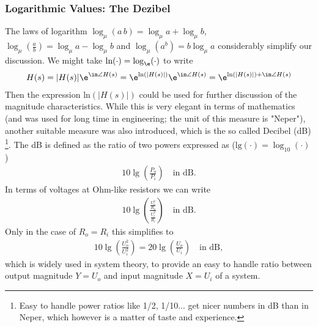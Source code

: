\subsubsection{Logarithmic Values: The Dezibel}
The laws of logarithm $\log_\mu (a \, b) = \log_\mu a + \log_\mu b$,
$\log_\mu (\frac{a}{b}) = \log_\mu a - \log_\mu b$
and
$\log_\mu(a^b) = b \log_\mu a$
considerably simplify our discussion.
%
We might take $\text{ln}(\cdot) = \log_\e(\cdot)$ to write
\begin{align}
H(s) = |H(s)| \e^{\im \angle H(s)} = \e^{\text{ln}(|H(s)|)} \e^{\im \angle H(s)}=
\e^{\text{ln}(|H(s)|)+\im \angle H(s)}
\end{align}
Then the expression $\text{ln}(|H(s)|)$ could be used for further discussion
of the magnitude characteristics.
%
While this is very elegant in terms of mathematics
(and was used for long time in engineering; the unit of this
measure is "Neper"),
another suitable measure was also introduced, which is the so called Decibel (dB)
\footnote{Easy to handle power ratios like 1/2, 1/10... get nicer numbers in dB
than in Neper, which however is a matter of taste and experience.}.
The dB is defined as the ratio of two powers expressed as ($\text{lg}(\cdot) = \log_{10}(\cdot)$)
\begin{align}
  10 \lg (\frac{P_o}{P_i}) \quad \text{in dB}.
\end{align}
%
In terms of voltages at Ohm-like resistors we can write
\begin{align}
  10 \lg (\frac{\frac{U_o^2}{R_o}}{\frac{U_i^2}{R_i}}) \quad \text{in dB}.
\end{align}
Only in the case of $R_o = R_i$ this simplifies to
\begin{align}
  10 \lg (\frac{U^2_o}{U^2_i}) = 20 \lg (\frac{U_o}{U_i}) \quad \text{in dB},
\end{align}
which is widely used in system theory, to provide an easy to handle ratio between
output magnitude $Y=U_o$ and input magnitude $X=U_i$ of a system.

